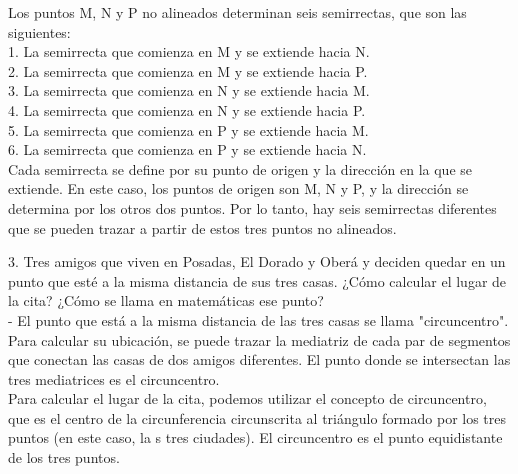 \documentclass{article}
\begin{document}
Los puntos M, N y P no alineados determinan seis semirrectas, que son las siguientes: \\

1. La semirrecta que comienza en M y se extiende hacia N.\\
2. La semirrecta que comienza en M y se extiende hacia P.\\
3. La semirrecta que comienza en N y se extiende hacia M.\\
4. La semirrecta que comienza en N y se extiende hacia P.\\
5. La semirrecta que comienza en P y se extiende hacia M.\\
6. La semirrecta que comienza en P y se extiende hacia N.\\

Cada semirrecta se define por su punto de origen y la dirección en la que se extiende. En este caso, los puntos de origen son M, N y P, y la dirección se determina por los otros dos puntos. Por lo tanto, hay seis semirrectas diferentes que se pueden trazar a partir de estos tres puntos no alineados.

3. Tres amigos que viven en Posadas, El Dorado y Oberá y deciden quedar en un punto que esté a la misma distancia de sus tres casas. ¿Cómo calcular el lugar de la cita? ¿Cómo se llama en matemáticas ese punto?  \\

- El punto que está a la misma distancia de las tres casas se llama "circuncentro". Para calcular su ubicación, se puede trazar la mediatriz de cada par de segmentos que conectan las casas de dos amigos diferentes. El punto donde se intersectan las tres mediatrices es el circuncentro. \\


Para calcular el lugar de la cita, podemos utilizar el concepto de circuncentro, que es el centro de la circunferencia circunscrita al triángulo formado por los tres puntos (en este caso, la s tres ciudades). El circuncentro es el punto equidistante de los tres puntos. \\
\end{document}
